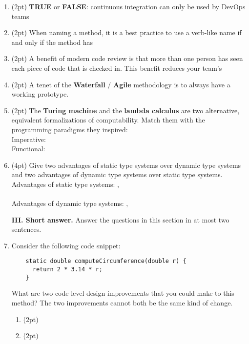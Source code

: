 \documentclass{report}
\newif\ifkey
\newcommand{\correct}[1]{\ifkey\color{red}\textbf{#1}\color{black}\else\textbf{#1}\fi\xspace}
\newcommand{\answershort}[1]{\ifkey\color{red}\underline{\textbf{#1}}\color{black}\else\underline{\hspace{3in}}\fi\xspace}
\newcommand*{\pts}[1]{\addtocounter{points}{#1}(#1pt)}
\begin{document}
\begin{spacing}{1.4}
\begin{enumerate}[leftmargin=*]
\item \pts{2}
  \textbf{TRUE} or \correct{FALSE}: continuous integration can only be used by DevOps teams

\item \pts{2}
  When naming a method, it is a best practice to use a verb-like name if and only if the method has \answershort{side-effects}

\item \pts{2}
  A benefit of modern code review is that more than one person has seen each piece of code that is checked in. This benefit
  reduces your team's \answershort{bus factor}

\item \pts{2}
  A tenet of the \textbf{Waterfall} / \correct{Agile} methodology is to always have a working prototype.

\item \pts{2}
  The \textbf{Turing machine} and the \textbf{lambda calculus} are two alternative, equivalent formalizations of computability.
  Match them with the programming paradigms they inspired: \\
  Imperative: \answershort{Turing machine} \\
  Functional: \answershort{lambda calculus}

\item \pts{4} Give two advantages of static type systems over dynamic type systems and two advantages of dynamic type systems over
  static type systems. \\
  Advantages of static type systems: \answershort{early detection of errors},\\ \answershort{types are documentation} \\
  Advantages of dynamic type systems: \answershort{faster prototyping},\\ \answershort{no false positives}

  
  \newpage

  \textbf{III. Short answer.} Answer the questions in this section in at most two sentences.

\item Consider the following code snippet: \\
  \begin{lstlisting}
    static double computeCircumference(double r) {
      return 2 * 3.14 * r;
    }
  \end{lstlisting}

  What are two code-level design improvements that you could make to this method? The two improvements cannot both be the same kind of change.
  \begin{enumerate}
  \item \pts{2} \answershort{replace 3.14 with a PI constant} 
  \item \pts{2} \answershort{rename ``r'' to ``radius'' or rename ``computeCircumference'' to ``circumference''}


\end{enumerate}
\end{enumerate}
\end{spacing}
\end{document}
